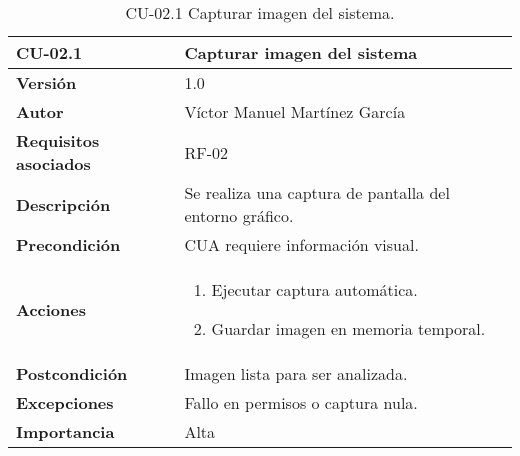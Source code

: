 \begin{table}[p]
    \centering
    \begin{tabularx}{\linewidth}{ p{} p{} }
        \toprule
        \textbf{CU-02.1}    & \textbf{Capturar imagen del sistema}\\
        \toprule
        \textbf{Versión}              & 1.0 \\
        \textbf{Autor}                & Víctor Manuel Martínez García \\
        \textbf{Requisitos asociados} & RF-02 \\
        \textbf{Descripción}          & Se realiza una captura de pantalla del entorno gráfico.\\
        \textbf{Precondición}         & CUA requiere información visual.\\
        \textbf{Acciones}             &
        \begin{enumerate}
          \item Ejecutar captura automática.
          \item Guardar imagen en memoria temporal.
        \end{enumerate}\\
        \textbf{Postcondición}        & Imagen lista para ser analizada.\\
        \textbf{Excepciones}          & Fallo en permisos o captura nula.\\
        \textbf{Importancia}          & Alta \\
        \bottomrule
    \end{tabularx}
    \caption{CU-02.1 Capturar imagen del sistema.}
    \label{CU-02.1 Capturar imagen del sistema}
\end{table}



